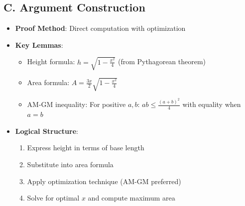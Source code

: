 \documentclass[12pt]{article}
\begin{document}
\begin{strategicbox}
\subsection*{C. Argument Construction}
\begin{itemize}[leftmargin=*]
    \item \textbf{Proof Method}: Direct computation with optimization
    \item \textbf{Key Lemmas}: 
    \begin{itemize}
        \item Height formula: $h = \sqrt{1 - \frac{x^2}{4}}$ (from Pythagorean theorem)
        \item Area formula: $A = \frac{3x}{2} \sqrt{1 - \frac{x^2}{4}}$
        \item AM-GM inequality: For positive $a, b$: $ab \leq \frac{(a+b)^2}{4}$ with equality when $a = b$
    \end{itemize}
    \item \textbf{Logical Structure}: 
    \begin{enumerate}
        \item Express height in terms of base length
        \item Substitute into area formula
        \item Apply optimization technique (AM-GM preferred)
        \item Solve for optimal $x$ and compute maximum area
    \end{enumerate}
\end{itemize}
\end{strategicbox}
\end{document}

